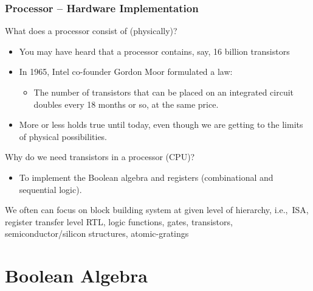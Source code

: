 \documentclass{beamer}
\begin{document}
\begin{frame}
\frametitle{Processor -- Hardware Implementation}

What does a processor consist of (physically)?

\begin{itemize}
\item You may have heard that a processor contains, say, 16 billion transistors
\item In 1965, Intel co-founder Gordon Moor formulated a law:
\begin{itemize}
\item The number of transistors that can be placed on an integrated circuit doubles every 18 months or so, at the same price.
\end{itemize}
\item More or less holds true until today, even though we are getting to the limits of physical possibilities.
\end{itemize}

Why do we need transistors in a processor (CPU)?
\begin{itemize}
\item To implement the Boolean algebra and registers (combinational and sequential logic).
\end{itemize}
We often can focus on block building system at given level of hierarchy, i.e.,\ ISA, register transfer level RTL, logic functions, gates, transistors, semiconductor/silicon structures, atomic-gratings
\end{frame}



\section{Boolean Algebra}
\end{document}
